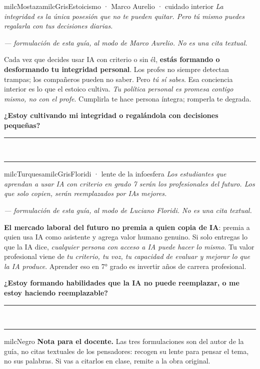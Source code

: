 \documentclass[11pt,letterpaper]{article}
\newcommand{\linead}[1]{\noindent\color{milcLinea}\rule{#1}{0.5pt}\color{milcNegro}}
\begin{document}
\begin{softbox}{milcMostaza}{milcGris}{Estoicismo · Marco Aurelio · cuidado interior}
\textit{La integridad es la única posesión que no te pueden quitar. Pero tú mismo puedes regalarla con tus decisiones diarias.}

{\footnotesize\itshape\color{milcNegro!70}--- formulación de esta guía, al modo de Marco Aurelio. No es una cita textual.}

Cada vez que decides usar IA con criterio o sin él, \textbf{estás formando o desformando tu integridad personal}. Los profes no siempre detectan trampas; los compañeros pueden no saber. Pero \emph{tú sí sabes}. Esa conciencia interior es lo que el estoico cultiva. \emph{Tu política personal es promesa contigo mismo, no con el profe}. Cumplirla te hace persona íntegra; romperla te degrada.

\textbf{¿Estoy cultivando mi integridad o regalándola con decisiones pequeñas?}
\end{softbox}
\linead{\linewidth}\\[1mm]
\linead{\linewidth}

\begin{softbox}{milcTurquesa}{milcGris}{Floridi · lente de la infoesfera}
\textit{Los estudiantes que aprendan a usar IA con criterio en grado 7 serán los profesionales del futuro. Los que solo copien, serán reemplazados por IAs mejores.}

{\footnotesize\itshape\color{milcNegro!70}--- formulación de esta guía, al modo de Luciano Floridi. No es una cita textual.}

\textbf{El mercado laboral del futuro no premia a quien copia de IA}: premia a quien usa IA como asistente y agrega valor humano genuino. Si solo entregas lo que la IA dice, \emph{cualquier persona con acceso a IA puede hacer lo mismo}. Tu valor profesional viene de \emph{tu criterio, tu voz, tu capacidad de evaluar y mejorar lo que la IA produce}. Aprender eso en 7° grado es invertir años de carrera profesional.

\textbf{¿Estoy formando habilidades que la IA no puede reemplazar, o me estoy haciendo reemplazable?}
\end{softbox}
\linead{\linewidth}\\[1mm]
\linead{\linewidth}

\begin{infoband}{milcNegro}
\textbf{Nota para el docente.} Las tres formulaciones son del autor de la guía, no citas textuales de los pensadores: recogen su lente para pensar el tema, no sus palabras. Si vas a citarlos en clase, remite a la obra original.
\end{infoband}
\end{document}
